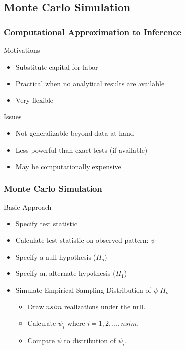\documentclass[nototal,handout]{beamer}
\begin{document}
\subsection{Monte Carlo Simulation}
\begin{frame}[<+->]
  \frametitle{Computational Approximation to Inference}
  \begin{block}{Motivations}
    \begin{itemize}
      \item Substitute capital for labor
      \item Practical when no analytical results are available
      \item Very flexible
    \end{itemize}
   \end{block}
   \begin{block}{Issues}
    \begin{itemize}
      \item Not generalizable beyond data at hand
      \item Less powerful than exact tests (if available)
      \item May be computationally expensive
    \end{itemize}
   \end{block}

 \end{frame}
\begin{frame}[<+->]
  \frametitle{Monte Carlo Simulation}
  \begin{block}{Basic Approach}
    \begin{itemize}
      \item Specify test statistic
      \item Calculate test statistic on observed pattern: $\psi$
      \item Specify a null hypothesis ($H_o$)
      \item Specify an alternate hypothesis ($H_1$)
      \item Simulate Empirical Sampling Distribution of $\psi|H_o$
	\begin{itemize}
	  \item Draw $nsim$ realizations under the null.
	  \item Calculate $\psi_i$ where $i=1,2,\ldots,nsim$.
	  \item Compare $\psi$ to distribution of $\psi_i$.
	\end{itemize}
    \end{itemize}
   \end{block}
 \end{frame}
\end{document}
